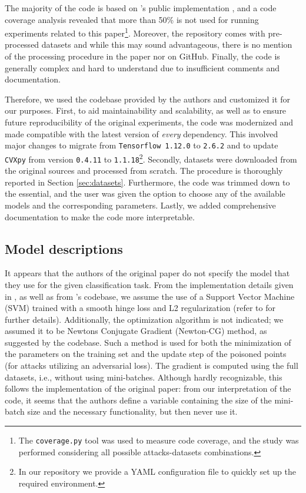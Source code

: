The majority of the code is based on 's public implementation \citep{koh2018_github}, and a code coverage analysis revealed that more than 50\% is not used for running experiments related to this paper\footnote{The \texttt{coverage.py} tool \citep{coverage_py} was used to measure code coverage, and the study was performed considering all possible attacks-datasets combinations.}. Moreover, the repository comes with pre-processed datasets and while this may sound advantageous, there is no mention of the processing procedure in the paper nor on GitHub. Finally, the code is generally complex and hard to understand due to insufficient comments and documentation.

Therefore, we used the codebase provided by the authors and customized it for our purposes. First, to aid maintainability and scalability, as well as to ensure future reproducibility of the original experiments, the code was modernized and made compatible with the latest version of \textit{every} dependency. This involved major changes to migrate from \texttt{Tensorflow 1.12.0} to \texttt{2.6.2} and to update \texttt{CVXpy} from version \texttt{0.4.11} to \texttt{1.1.18}\footnote{In our repository we provide a YAML configuration file to quickly set up the required environment.}. Secondly, datasets were downloaded from the original sources \citep{german_drug_dataset, compas_dataset} and processed from scratch. The procedure is thoroughly reported in Section \ref{sec:datasets}. Furthermore, the code was trimmed down to the essential, and the user was given the option to choose any of the available models and the corresponding parameters. Lastly, we added comprehensive documentation to make the code more interpretable.


\subsection{Model descriptions}
\label{sec:model_descriptions}

It appears that the authors of the original paper do not specify the model that they use for the given classification task. From the implementation details given in , as well as from \citep{originalpaper}'s codebase, we assume the use of a Support Vector Machine (SVM) trained with a smooth hinge loss and L2 regularization (refer to \cite{koh2018} for further details). Additionally, the optimization algorithm is not indicated; we assumed it to be Newtons Conjugate Gradient (Newton-CG) method, as suggested by the codebase. Such a method is used for both the minimization of the parameters on the training set and the update step of the poisoned points (for attacks utilizing an adversarial loss). The gradient is computed using the full datasets, i.e., without using mini-batches. Although hardly recognizable, this follows the implementation of the original paper: from our interpretation of the code, it seems that the authors define a variable containing the size of the mini-batch size and the necessary functionality, but then never use it. 

